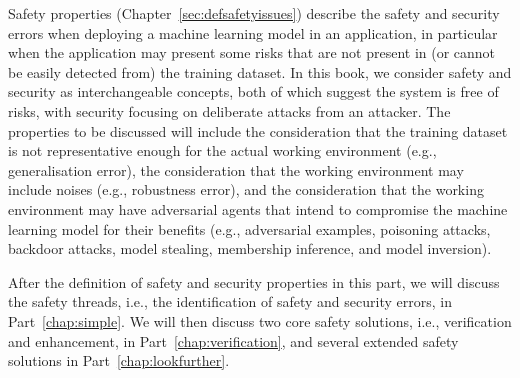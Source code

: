 \begin{partbacktext}


Safety properties (Chapter~\ref{sec:defsafetyissues}) describe the safety and security errors when deploying a machine learning model in an application, in particular when the application may present some risks that are not present in (or cannot be easily detected from) the training dataset. 
In this book, we consider safety and security as interchangeable concepts, both of which suggest the system is free of risks, with security focusing on deliberate attacks from an attacker.
The properties to be discussed will include the consideration that the training dataset is not representative enough for the actual working environment (e.g., generalisation error), the consideration that the working  environment may include noises (e.g., robustness error), and the consideration that the working environment may have adversarial agents that intend to compromise the machine learning model for their benefits (e.g., adversarial examples, poisoning attacks, backdoor attacks, model stealing, membership inference, and model inversion).

After the definition of safety and security properties in this part, we will discuss the safety threads, i.e., the identification of safety and security errors, in  Part~\ref{chap:simple}. We will then discuss
two core safety solutions, i.e., verification and enhancement, in Part~\ref{chap:verification}, and several extended safety solutions in Part~\ref{chap:lookfurther}.


\end{partbacktext}